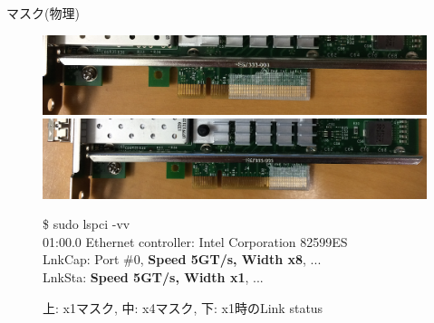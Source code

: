 \documentclass[10pt, compress]{beamer}
\begin{document}

\begin{frame}{マスク(物理)}

\begin{figure}
\includegraphics[width=.9\textwidth]{pic/x1.png} \\
\includegraphics[width=.9\textwidth]{pic/x4.png}

\begin{scriptsize}
\begin{tcolorbox}[width=.9\linewidth]
\$ sudo lspci -vv\\
01:00.0 Ethernet controller: Intel Corporation 82599ES\\
LnkCap: Port \#0, \textbf{Speed 5GT/s, Width x8}, ... \\
LnkSta: \textbf{Speed 5GT/s, Width x1}, ...
\end{tcolorbox}
\end{scriptsize}
\vspace{-.5em}
\small{上: x1マスク, 中: x4マスク, 下: x1時のLink status}
\end{figure}

\end{frame}

\end{document}
